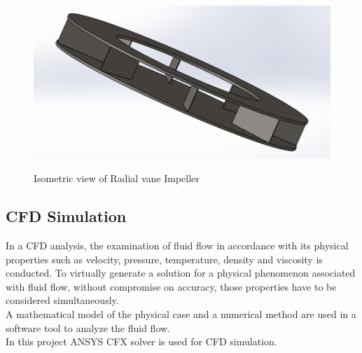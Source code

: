 \documentclass[11pt]{article}
\begin{document}
\begin{center}
 \begin{figure}[hbt!]
 \centering
 \includegraphics[scale=.6]{isometric2.png}\\
 \caption{Isometric view of Radial vane Impeller}
 \end{figure}
 \end{center}

\subsection{CFD Simulation}
In a CFD analysis, the examination of fluid flow in accordance with its physical properties such as velocity, pressure, temperature, density and viscosity is conducted. To virtually generate a solution for a physical phenomenon associated with fluid flow, without compromise on accuracy, those properties have to be considered simultaneously.\\
A mathematical model of the physical case and a numerical method are used in a software tool to analyze the fluid flow.\\
In this project ANSYS CFX solver is used for CFD simulation.
\end{document}
